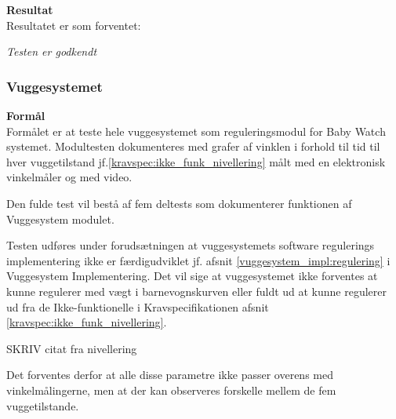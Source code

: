 
\textbf{Resultat} \\
Resultatet er som forventet:

\textit{Testen er godkendt}

\subsubsection{Vuggesystemet}
\textbf{Formål} \\
Formålet er at teste hele vuggesystemet som reguleringsmodul for Baby Watch systemet. Modultesten dokumenteres med grafer af vinklen i forhold til tid til hver vuggetilstand jf.\vref{kravspec:ikke_funk_nivellering} målt med en elektronisk vinkelmåler og med video.

Den fulde test vil bestå af fem deltests som dokumenterer funktionen af Vuggesystem modulet.

Testen udføres under forudsætningen  at vuggesystemets software regulerings implementering ikke er færdigudviklet jf. afsnit \vref{vuggesystem_impl:regulering} i Vuggesystem Implementering. Det vil sige at vuggesystemet ikke forventes at kunne regulerer med vægt i barnevognskurven eller fuldt ud at kunne regulerer ud fra de Ikke-funktionelle i Kravspecifikationen afsnit \vref{kravspec:ikke_funk_nivellering}.

SKRIV citat fra nivellering

Det forventes derfor at alle disse parametre ikke passer overens med vinkelmålingerne, men at der kan observeres forskelle mellem de fem vuggetilstande.

